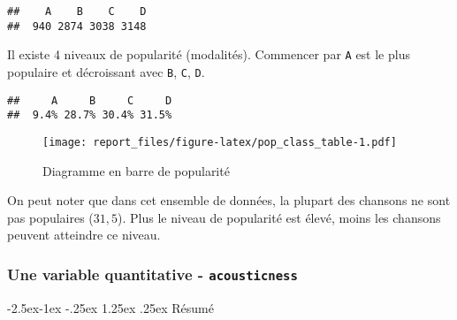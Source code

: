 \documentclass[
  12pt,
]{article}
\makeatletter
\newenvironment{Shaded}{\begin{snugshade}}{\end{snugshade}}
\newcommand{\AttributeTok}[1]{\textcolor[rgb]{0.77,0.63,0.00}{#1}}
\newcommand{\FunctionTok}[1]{\textcolor[rgb]{0.00,0.00,0.00}{#1}}
\newcommand{\NormalTok}[1]{#1}
\newcommand{\OtherTok}[1]{\textcolor[rgb]{0.56,0.35,0.01}{#1}}
\newcommand{\SpecialCharTok}[1]{\textcolor[rgb]{0.00,0.00,0.00}{#1}}
\renewcommand\paragraph{\@startsection{paragraph}{4}{\z@}%
        {-2.5ex\@plus -1ex \@minus -.25ex}%
        {1.25ex \@plus .25ex}%
        {\normalfont\normalsize\bfseries}}
\makeatother
\begin{document}
\begin{verbatim}
##    A    B    C    D 
##  940 2874 3038 3148
\end{verbatim}

Il existe 4 niveaux de popularité (modalités). Commencer par \texttt{A}
est le plus populaire et décroissant avec \texttt{B}, \texttt{C},
\texttt{D}.

\begin{Shaded}
\end{Shaded}

\begin{verbatim}
##     A     B     C     D 
##  9.4% 28.7% 30.4% 31.5%
\end{verbatim}

\begin{figure}
\centering
\texttt{[image: report\_files/figure-latex/pop\_class\_table-1.pdf]}
\caption{Diagramme en barre de popularité}
\end{figure}

On peut noter que dans cet ensemble de données, la plupart des chansons
ne sont pas populaires (\(31,5%
\)). Plus le niveau de popularité est élevé, moins les chansons peuvent
atteindre ce niveau.

\hypertarget{une-variable-quantitative---acousticness}{%
\subsubsection{\texorpdfstring{Une variable quantitative -
\texttt{acousticness}}{Une variable quantitative - acousticness}}\label{une-variable-quantitative---acousticness}}

\hypertarget{ruxe9sumuxe9}{%
\paragraph{Résumé}\label{ruxe9sumuxe9}}

\begin{Shaded}
\end{Shaded}
\end{document}

